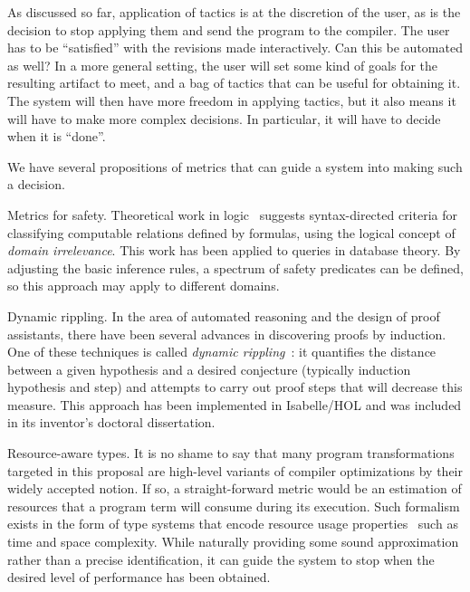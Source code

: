 As discussed so far, application of tactics is at the discretion of the
user, as is the decision to stop applying them and send the program to
the compiler.
The user has to be ``satisfied'' with the revisions made interactively.
Can this be automated as well?
In a more general setting, the user will set some kind of goals for the
resulting artifact to meet, and a bag of tactics that can be useful for
obtaining it.
The system will then have more freedom in applying tactics, but it also
means it will have to make more complex decisions.
In particular, it will have to decide when it is ``done''.

We have several propositions of metrics that can guide a system into
making such a decision.

\begin{paragraph}{Metrics for safety.} 
Theoretical work in logic~\cite{MLCS1994/Avron} suggests syntax-directed
criteria for classifying computable relations defined by formulas,
using the logical concept of \emph{domain irrelevance}.
This work has been applied to queries in database theory.
By adjusting the basic inference rules, a spectrum of safety predicates can
be defined, so this approach may apply to different domains.
\end{paragraph}

\begin{paragraph}{Dynamic rippling.}
In the area of automated reasoning and the design of proof assistants,
there have been several advances in discovering proofs by induction.
One of these techniques is called \emph{dynamic rippling}~\cite{Festschrift2017/JohanssonDB10}:
it quantifies the distance between a given hypothesis and a desired conjecture
(typically induction hypothesis and step) and attempts to carry out proof
steps that will decrease this measure.
This approach has been implemented in Isabelle/HOL and was included in
its inventor's doctoral dissertation.
\end{paragraph}

\begin{paragraph}{Resource-aware types.}
It is no shame to say that many program transformations targeted in this
proposal are high-level variants of compiler optimizations by their widely
accepted notion.
If so, a straight-forward metric would be an estimation of resources
that a program term will consume during its execution.
Such formalism exists in the form of type systems that encode resource
usage properties~\cite{CAV2012/Hoffman} such as time and space complexity.
While naturally providing some sound approximation rather than a precise
identification, it can guide the system to stop when the desired level
of performance has been obtained.
\end{paragraph}

